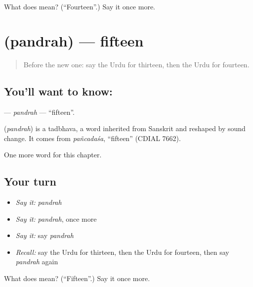 \begin{tcolorbox}[breakable,colback=teal!4,colframe=teal!35!black,title={Before you move on}]
What does  mean? (\textquotedblleft{}Fourteen\textquotedblright{}.) Say it once more.
\end{tcolorbox}
\section[\texorpdfstring{\ur{پندرہ} (pandrah)}{پندرہ (pandrah)}]{ (pandrah) — fifteen}

\label{lesson:UR-C84-pandrah}



\begin{quote}
Before the new one: say the Urdu for thirteen, then the Urdu for fourteen.
\end{quote}

\subsection*{You'll want to know: }
\textbf{} — \emph{pandrah} — \textquotedblleft{}fifteen\textquotedblright{}.

\begin{cousinweb}
\textbf{} (\emph{pandrah}) is a tadbhava, a word inherited from Sanskrit and reshaped by sound change. It comes from \emph{pañcadaśa}, \textquotedblleft{}fifteen\textquotedblright{} (CDIAL 7662).
\end{cousinweb}

\begin{grammarlens}[title={What you've built}]
One more word for this chapter.
\end{grammarlens}

\subsection*{Your turn}
\begin{itemize}
\raggedright
  \item \emph{Say it:} \emph{pandrah}
  \item \emph{Say it:} \emph{pandrah}, once more
  \item \emph{Say it:} say \emph{pandrah}
  \item \emph{Recall:} say the Urdu for thirteen, then the Urdu for fourteen, then say \emph{pandrah} again
\end{itemize}

\begin{tcolorbox}[breakable,colback=teal!4,colframe=teal!35!black,title={Before you move on}]
What does  mean? (\textquotedblleft{}Fifteen\textquotedblright{}.) Say it once more.
\end{tcolorbox}

